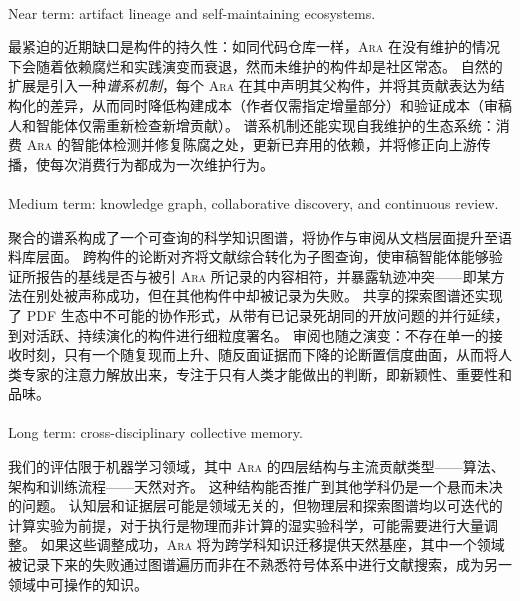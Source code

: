 \documentclass[
]{article}
\makeatletter
\let\oldparagraph\paragraph
\renewcommand{\paragraph}{
    \@ifstar
      \xxxParagraphStar
      \xxxParagraphNoStar
  }
\newcommand{\xxxParagraphStar}[1]{\oldparagraph*{#1}\mbox{}}
\newcommand{\xxxParagraphNoStar}[1]{\oldparagraph{#1}\mbox{}}
\theoremstyle{definition}
\newcommand{\ara}{\textsc{Ara}}
\makeatother
\begin{document}
\paragraph{Near term: artifact lineage and self-maintaining
ecosystems.}\label{near-term-artifact-lineage-and-self-maintaining-ecosystems.}

最紧迫的近期缺口是构件的持久性：如同代码仓库一样，\ara{}
在没有维护的情况下会随着依赖腐烂和实践演变而衰退，然而未维护的构件却是社区常态。
自然的扩展是引入一种\emph{谱系机制}，每个 \ara{}
在其中声明其父构件，并将其贡献表达为结构化的差异，从而同时降低构建成本（作者仅需指定增量部分）和验证成本（审稿人和智能体仅需重新检查新增贡献）。
谱系机制还能实现自我维护的生态系统：消费 \ara{}
的智能体检测并修复陈腐之处，更新已弃用的依赖，并将修正向上游传播，使每次消费行为都成为一次维护行为。

\paragraph{Medium term: knowledge graph, collaborative discovery, and
continuous
review.}\label{medium-term-knowledge-graph-collaborative-discovery-and-continuous-review.}

聚合的谱系构成了一个可查询的科学知识图谱，将协作与审阅从文档层面提升至语料库层面。
跨构件的论断对齐将文献综合转化为子图查询，使审稿智能体能够验证所报告的基线是否与被引
\ara{}
所记录的内容相符，并暴露轨迹冲突------即某方法在别处被声称成功，但在其他构件中却被记录为失败。
共享的探索图谱还实现了 PDF
生态中不可能的协作形式，从带有已记录死胡同的开放问题的并行延续，到对活跃、持续演化的构件进行细粒度署名。
审阅也随之演变：不存在单一的接收时刻，只有一个随复现而上升、随反面证据而下降的论断置信度曲面，从而将人类专家的注意力解放出来，专注于只有人类才能做出的判断，即新颖性、重要性和品味。

\paragraph{Long term: cross-disciplinary collective
memory.}\label{long-term-cross-disciplinary-collective-memory.}

我们的评估限于机器学习领域，其中 \ara{}
的四层结构与主流贡献类型------算法、架构和训练流程------天然对齐。
这种结构能否推广到其他学科仍是一个悬而未决的问题。
认知层和证据层可能是领域无关的，但物理层和探索图谱均以可迭代的计算实验为前提，对于执行是物理而非计算的湿实验科学，可能需要进行大量调整。
如果这些调整成功，\ara{}
将为跨学科知识迁移提供天然基座，其中一个领域被记录下来的失败通过图谱遍历而非在不熟悉符号体系中进行文献搜索，成为另一领域中可操作的知识。
\end{document}
